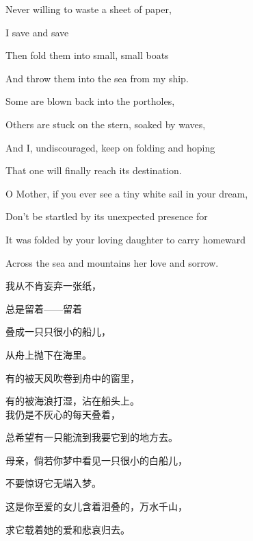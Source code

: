 { 	Never willing to waste a sheet of paper,
	
	I save and save
	
	Then fold them into small, small boats
	
	And throw them into the sea from my ship.
	
	Some are blown back into the portholes,
	
	Others are stuck on the stern, soaked by waves,
	
	And I, undiscouraged, keep on folding and hoping
	
	That one will finally reach its destination.
	
	O Mother, if you ever see a tiny white sail in your dream,
	
	Don't be startled by its unexpected presence for
	
	It was folded by your loving daughter to carry homeward
	
	Across the sea and mountains her love and sorrow.
}{
我从不肯妄弃一张纸，

总是留着——留着

叠成一只只很小的船儿，

从舟上抛下在海里。　

有的被天风吹卷到舟中的窗里，

有的被海浪打湿，沾在船头上。\\


我仍是不灰心的每天叠着，

总希望有一只能流到我要它到的地方去。

母亲，倘若你梦中看见一只很小的白船儿，

不要惊讶它无端入梦。

这是你至爱的女儿含着泪叠的，万水千山，

求它载着她的爱和悲哀归去。

}
